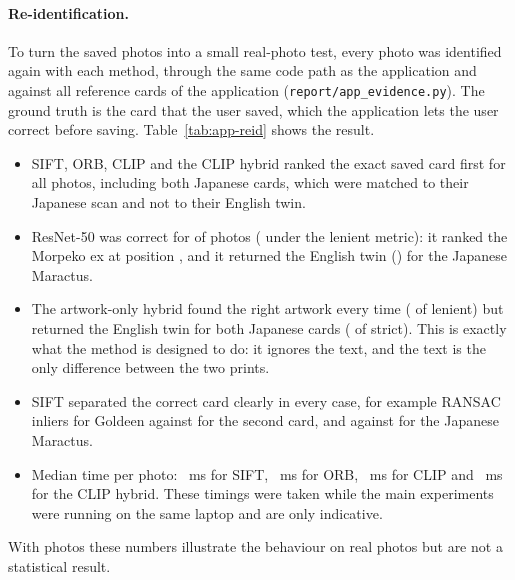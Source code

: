 \paragraph{Re-identification.} To turn the saved photos into a small real-photo test, every photo was identified again with each method, through the same code path as the application and against all  reference cards of the application (\texttt{report/app\_evidence.py}). The ground truth is the card that the user saved, which the application lets the user correct before saving. Table~\ref{tab:app-reid} shows the result.
\begin{itemize}
  \item SIFT, ORB, CLIP and the CLIP hybrid ranked the exact saved card first for all  photos, including both Japanese cards, which were matched to their Japanese scan and not to their English twin.
  \item ResNet-50 was correct for  of  photos ( under the lenient metric): it ranked the Morpeko ex at position , and it returned the English twin (\texttt{}) for the Japanese Maractus.
  \item The artwork-only hybrid found the right artwork every time ( of  lenient) but returned the English twin for both Japanese cards ( of  strict). This is exactly what the method is designed to do: it ignores the text, and the text is the only difference between the two prints.
  \item SIFT separated the correct card clearly in every case, for example  RANSAC inliers for Goldeen against  for the second card, and  against  for the Japanese Maractus.
  \item Median time per photo: ~ms for SIFT, ~ms for ORB, ~ms for CLIP and ~ms for the CLIP hybrid. These timings were taken while the main experiments were running on the same laptop and are only indicative.
\end{itemize}
With  photos these numbers illustrate the behaviour on real photos but are not a statistical result.



